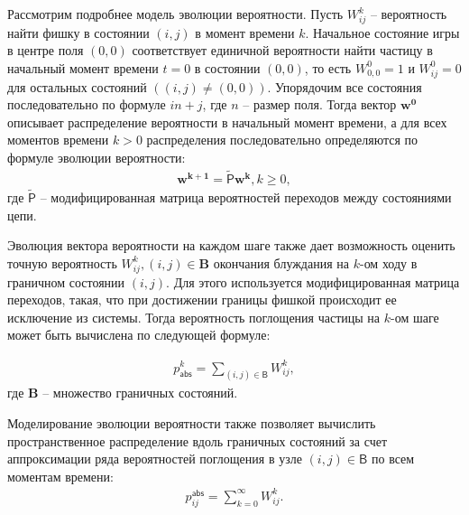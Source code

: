 Рассмотрим подробнее модель эволюции вероятности. Пусть $W_{ij}^{k}$ -- вероятность найти фишку в состоянии $(i, j)$ в момент времени $k$. Начальное состояние игры в центре поля $(0, 0)$ соответствует единичной вероятности найти частицу в начальный момент времени $t=0$ в состоянии $(0, 0)$, то есть $W_{0,0}^{0}=1$ и $W_{ij}^{0}=0$ для остальных состояний $((i, j) \neq (0, 0))$. Упорядочим все состояния последовательно по формуле $in + j$, где $n$ -- размер поля. Тогда вектор $\boldsymbol{w^{0}}$ описывает распределение вероятности в начальный момент времени, а для всех моментов времени $k > 0$ распределения последовательно определяются по формуле эволюции вероятности:
\begin{equation}
    \begin{aligned}
    \boldsymbol{w^{k+1}}=\mathsf{\widetilde{P}}\boldsymbol{w^{k}}, k \geq 0,
    \label{eq:evolution}
    \end{aligned}
\end{equation}
где $\mathsf{\widetilde{P}}$ -- модифицированная матрица вероятностей переходов между состояниями цепи. 

Эволюция вектора вероятности на каждом шаге также дает возможность оценить точную вероятность $W_{ij}^{k}, (i, j) \in \boldsymbol{B}$ окончания блуждания на $k$-ом ходу в граничном состоянии $(i, j)$. Для этого используется модифицированная матрица переходов, такая, что при достижении границы фишкой происходит ее исключение из системы. Тогда вероятность поглощения частицы на $k$-ом шаге может быть вычислена по следующей формуле:

\begin{equation}
    \begin{aligned}
    p_\mathsf{abs}^{k}=\sum_{(i, j) \in \boldsymbol{\mathsf{B}}} W_{ij}^{k},
    \label{eq:timedistr}
    \end{aligned}
\end{equation}
где $\textbf{B}$ -- множество граничных состояний.

Моделирование эволюции вероятности также позволяет вычислить пространственное распределение вдоль граничных состояний за счет аппроксимации ряда вероятностей поглощения в узле $(i, j) \in \boldsymbol{\mathsf{B}}$ по всем моментам времени:
\begin{equation}
    \begin{aligned}
    p_{ij}^\mathsf{abs}=\sum_{k=0}^{\infty} W_{ij}^{k}.
    \label{eq:spacedistr}
    \end{aligned}
\end{equation}

